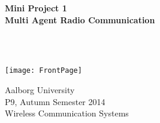 \begin{center}
	\vspace*{1.5cm}
	
	\begin{Huge}
		\textbf{Mini Project 1\\
		Multi Agent Radio Communication}
	\end{Huge}\\~\\
	
	\vspace*{2cm}
	
	\texttt{[image: FrontPage]}
	\vspace*{2cm}
    
	Aalborg University\\
	P9, Autumn Semester 2014\\
	Wireless Communication Systems\\
\end{center}